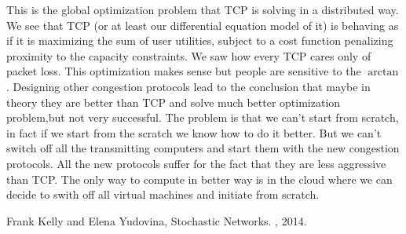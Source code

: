 This is the global optimization problem that TCP is solving in a distributed way. We see that TCP (or at least our differential equation model of it) is behaving as if it is maximizing the sum of user utilities, subject to a cost function penalizing proximity to the capacity constraints.
We saw how every TCP cares only of packet loss. This optimization makes sense but people are sensitive to the $\arctan$. Designing other congestion protocols lead to the conclusion that maybe in theory they are better than TCP and solve much better optimization problem,but not very successful. The problem is that we can't start from scratch, in fact if we start from the scratch we know how to do it better. But we can't switch off all the transmitting computers and start them with the new congestion protocols. All the new protocols suffer for the fact that they are less aggressive than TCP. The only way to compute in better way is in the cloud where we can decide to swith off all virtual machines and initiate from scratch.

\begin{thebibliography}{alpha}
	
	 Frank Kelly and Elena Yudovina,
	\newblock Stochastic Networks.
	, 2014.
	
\end{thebibliography}































































